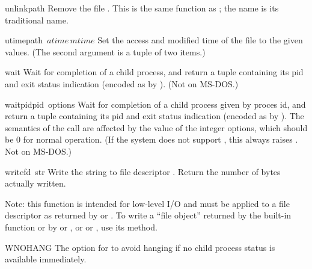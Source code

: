 \begin{funcdesc}{unlink}{path}
Remove the file .  This is the same function as ;
the  name is its traditional \UNIX{} name.
\end{funcdesc}

\begin{funcdesc}{utime}{path\, \(atime\, mtime\)}
Set the access and modified time of the file to the given values.
(The second argument is a tuple of two items.)
\end{funcdesc}

\begin{funcdesc}{wait}{}
Wait for completion of a child process, and return a tuple containing
its pid and exit status indication (encoded as by \UNIX{}).
(Not on MS-DOS.)
\end{funcdesc}

\begin{funcdesc}{waitpid}{pid\, options}
Wait for completion of a child process given by proces id, and return
a tuple containing its pid and exit status indication (encoded as by
\UNIX{}).  The semantics of the call are affected by the value of
the integer options, which should be 0 for normal operation.  (If the
system does not support , this always raises
.  Not on MS-DOS.)
\end{funcdesc}

\begin{funcdesc}{write}{fd\, str}
Write the string  to file descriptor .
Return the number of bytes actually written.

Note: this function is intended for low-level I/O and must be applied
to a file descriptor as returned by  or
.  To write a ``file object'' returned by the
built-in function  or by  or
, or  or , use
its  method.
\end{funcdesc}

\begin{datadesc}{WNOHANG}
The option for  to avoid hanging if no child process
status is available immediately.
\end{datadesc}
